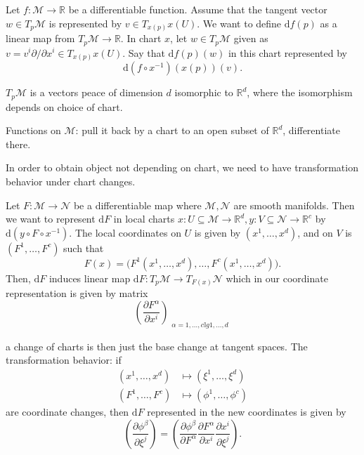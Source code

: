 \begin{intuition}
	Let \(f\colon \mathcal{M} \to  \mathbb{R} \) be a differentiable function. Assume that the tangent vector \(w\in T_p \mathcal{M} \) is represented by \(v\in T_{x(p)}x(U)\). We want to define \(\mathrm{d} f(p)\) as a linear map from \(T_p \mathcal{M} \to \mathbb{R} \). In chart \(x\), let \(w\in T_p \mathcal{M} \) given as \(v = v^i \partial /\partial x^i\in T_{x(p)}x(U)\). Say that \(\mathrm{d} f(p)(w)\) in this chart represented by
	\[
		\mathrm{d} (f \circ x ^{-1} )(x(p)) (v).
	\]
	\begin{center}
	\end{center}
\end{intuition}

\begin{remark}
	\(T_p \mathcal{M} \) is a vectors peace of dimension \(d\) isomorphic to \(\mathbb{R} ^d\), where the isomorphism depends on choice of chart.
\end{remark}

\begin{remark}
	Functions on \(\mathcal{M} \): pull it back by a chart to an open subset of \(\mathbb{R} ^d\), differentiate there.
\end{remark}

\begin{remark}
	In order to obtain object not depending on chart, we need to have transformation behavior under chart changes.
\end{remark}

Let \(F\colon \mathcal{M} \to  \mathcal{N} \) be a differentiable map where \(\mathcal{M} , \mathcal{N} \) are smooth manifolds. Then we want to represent \(\mathrm{d} F\) in local charts \(x\colon U \subseteq \mathcal{M} \to  \mathbb{R} ^d, y\colon V \subseteq \mathcal{N} \to  \mathbb{R} ^c\) by \(\mathrm{d} (y \circ F \circ x ^{-1} )\). The local coordinates on \(U\) is given by \((x^1, \ldots , x^d)\), and on \(V\) is \((F^1, \ldots , F^c)\) such that
\[
	F(x) = \big(F^1(x^1, \ldots , x^d), \ldots , F^c(x^1, \ldots , x^d)\big).
\]
Then, \(\mathrm{d} F\) induces linear map \(\mathrm{d} F\colon T_p \mathcal{M} \to  T_{F(x)}\mathcal{N} \) which in our coordinate representation is given by matrix
\[
	\left( \frac{\partial F^\alpha }{\partial x^i}  \right) _{\substack{\alpha =1, \ldots , c \mathbb{I}  g 1, \ldots , d}}
\]

\begin{center}
\end{center}

a change of charts is then just the base change at tangent spaces. The transformation behavior: if
\[
	\begin{split}
		(x^1, \ldots , x^d) &\mapsto (\xi ^1, \ldots , \xi ^d)\\
		(F^1, \ldots , F^c) &\mapsto (\phi ^1, \ldots , \phi ^c)
	\end{split}
\]
are coordinate changes, then \(\mathrm{d} F\) represented in the new coordinates is given by
\[
	\left( \frac{\partial \phi ^\beta }{\partial \xi ^j}  \right)
	= \left( \frac{\partial \phi ^\beta }{\partial F^\alpha } \frac{\partial F^\alpha }{\partial x^i} \frac{\partial x^i}{\partial \xi ^j} \right).
\]
